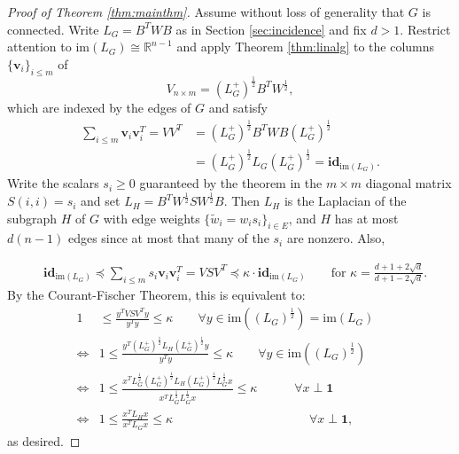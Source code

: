 \documentclass[12pt]{article}
\renewcommand{\v}{\mathbf{v}}
\newcommand{\im}{\mathrm{im}}
\newcommand{\R}{\mathbb{R}}
\renewcommand{\v}{\mathbf{v}}
\newcommand{\id}{\mathbf{id}}
\begin{document}
\begin{proof}[Proof of Theorem \ref{thm:mainthm}]
Assume without loss of generality that $G$ is connected. Write $L_G=B^TWB$ as in Section \ref{sec:incidence} and fix $d>1$. 
Restrict attention to $\im(L_G)\cong \R^{n-1}$ and apply Theorem \ref{thm:linalg} to the columns $\{\v_i\}_{i\le m}$ of 
\[
  V_{n\times m} = (L_G^+)^{\frac{1}{2}}B^TW^{\frac{1}{2}},
\] 
which are indexed by the edges of $G$ and satisfy
\begin{align*}
  \sum_{i\le m} \v_i\v_i^T = VV^T &= (L_G^+)^{\frac{1}{2}}B^TWB(L_G^+)^{\frac{1}{2}}
  \\&= (L_G^+)^{\frac{1}{2}}L_G(L_G^+)^{\frac{1}{2}} = \id_{\im(L_G)}.
\end{align*}
Write the scalars $s_i\ge 0$ guaranteed by the theorem in the $m\times m$ diagonal
matrix $S(i,i)=s_i$ and set $L_H=B^TW^{\frac{1}{2}}SW^{\frac{1}{2}}B$. Then $L_H$ is the Laplacian of
the subgraph $H$ of $G$ with edge weights $\{\tilde{w}_i=w_i s_i\}_{i\in E}$, and $H$ has at most $d(n-1)$
edges since at most that many of the $s_i$ are nonzero. Also,

\begin{align*} 
  &\id_{\im(L_G)}\preceq 
  \sum_{i\le m}s_i\v_i\v_i^T = VSV^T 
  \preceq \kappa \cdot \id_{\im(L_G)}
  \qquad\textrm{for $\kappa=\frac{d+1+2\sqrt{d}}{d+1-2\sqrt{d}}$.}
\end{align*}
By the Courant-Fischer Theorem, this is equivalent to:
\begin{align*}
  1&\le \frac{
      y^TVSV^Ty
    }{
      y^Ty
    } 
    \le 
    \kappa 
 \qquad \forall y\in\im((L_G)^\frac{1}{2})=\im(L_G)&
\\\iff &1\le 
    \frac{
      y^T(L_G^+)^{\frac{1}{2}}L_H(L_G^+)^{\frac{1}{2}}y
    }{
      y^Ty
    }
  \le 
  \kappa
\qquad\forall y\in\im((L_G)^{\frac{1}{2}})&
\\\iff &1\le 
    \frac{
      x^TL_G^{\frac{1}{2}}(L_G^{+})^{\frac{1}{2}}L_H(L_G^+)^{\frac{1}{2}}L_G^{\frac{1}{2}}x
    }{
      x^TL_G^{\frac{1}{2}}L_G^{\frac{1}{2}}x
    }
    \le \kappa\quad\qquad\forall x\perp \mathbf{1}
\\\iff &1\le 
    \frac{
      x^TL_Hx
    }{
      x^TL_Gx
    }\le \kappa\quad\qquad\qquad\qquad\qquad\qquad\forall x\perp \mathbf{1},
\end{align*}
as desired.
\end{proof}
\end{document}
